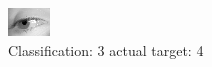 \begin{figure}[h!]
\begin{center}
\includegraphics[width=0.60\columnwidth]{figures/ID2923_class_3_target_4.png}
\end{center}
\caption{ Classification: 3 actual target: 4}
\label{fig:ID2923_class_3_target_4}
\end{figure}
